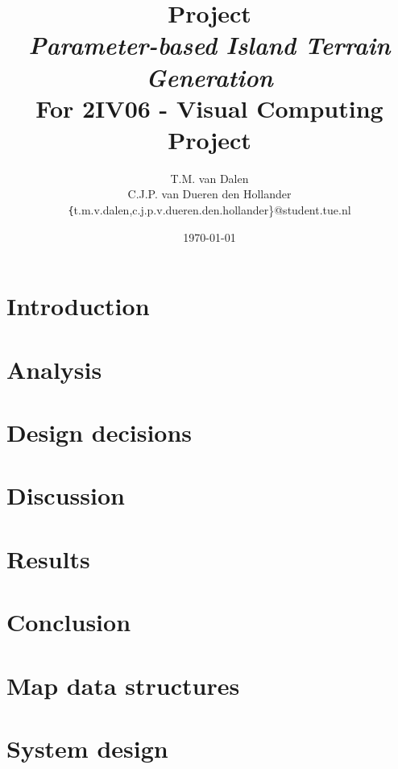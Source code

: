 \documentclass[11pt,a4paper,twocolumn]{article}
\title{
	{\huge Project\\ \emph{Parameter-based Island Terrain Generation}}\\
	{\large For 2IV06 - Visual Computing Project}
}
\author{
	T.M. van Dalen \\
	C.J.P. van Dueren den Hollander\\
	{\texttt\{t.m.v.dalen,c.j.p.v.dueren.den.hollander\}}@student.tue.nl
}
\date{\today}
\begin{document}
	\maketitle
	
	
	
	\section{Introduction}
	\label{sec:intro}
	
	
	\section{Analysis}
	\label{sec:analysis}
	
	
	\section{Design decisions}
	\label{sec:choices}
	
	
	\section{Discussion}
	\label{sec:discussion}
	
	
	\section{Results}
	\label{sec:results}
	
	
	\section{Conclusion}
	\label{sec:conclusion}
	

	\begin{appendices}
	\section{Map data structures}
	\label{appendix:mapdatastructures}
	

	\section{System design}
	\label{appendix:system}
	
	\end {appendices}

	
	
\end{document}
